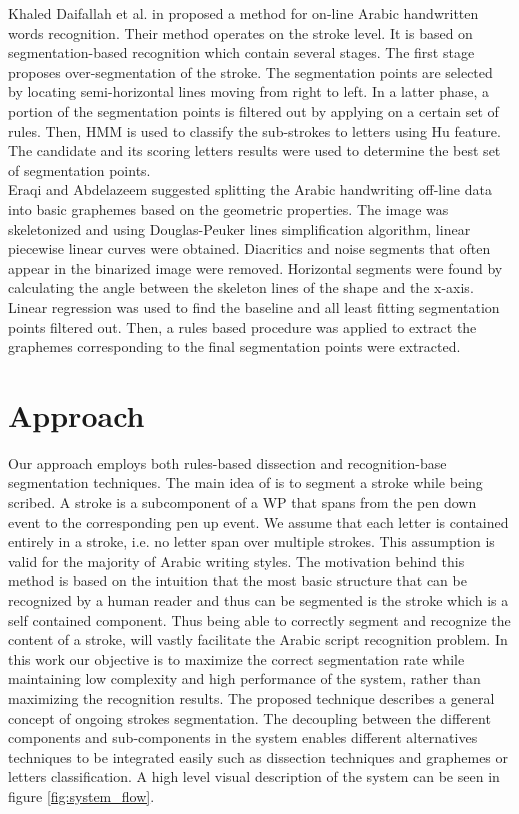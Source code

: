 \documentclass[journal,compsoc]{IEEEtran}
\begin{document}
Khaled Daifallah et al. in \cite{daifallah2009recognition} proposed a method for on-line Arabic handwritten words recognition. Their method operates on the stroke level. It is based on segmentation-based recognition which contain several stages. The first stage proposes over-segmentation of the stroke. The segmentation points are selected by locating semi-horizontal lines moving from right to left. In a latter phase, a portion of the segmentation points is filtered out by applying on a certain set of rules. Then, HMM is used to classify the sub-strokes to letters using Hu feature. The candidate and its scoring letters results were used to determine the best set of segmentation points. \\

Eraqi and Abdelazeem \cite{eraqi2012new} suggested splitting the Arabic handwriting off-line data into basic graphemes based on the geometric properties. The image was skeletonized and using Douglas-Peuker lines simplification algorithm, linear piecewise linear curves were obtained. Diacritics and noise segments that often appear in the binarized image were removed. Horizontal segments were found by calculating the angle between the skeleton lines of the shape and the x-axis. Linear regression was used to find the baseline and all least fitting segmentation points filtered out. Then, a rules based procedure was applied to extract the graphemes corresponding to the final segmentation points were extracted.    

\section{Approach}
\label{sec:approach}
Our approach employs both rules-based dissection and recognition-base segmentation techniques. The main idea of is to  segment a stroke while being scribed. A stroke is a subcomponent of a WP that spans from the pen down event to the corresponding pen up event. We assume that each letter is contained entirely in a stroke, i.e. no letter span over multiple strokes. This assumption is valid for the majority of Arabic writing styles. The motivation behind this method is based on the intuition that the most basic structure that can be recognized by a human reader and thus can be segmented is the stroke which is a self contained component. Thus being able to correctly segment and recognize the content of a stroke, will vastly facilitate the Arabic script recognition problem. In this work our objective is to maximize the correct segmentation rate while maintaining low complexity and high performance of the system, rather than maximizing the recognition results. 
The proposed technique describes a general concept of ongoing strokes segmentation. The decoupling between the different components and sub-components in the system enables different alternatives techniques to be integrated easily such as dissection techniques and graphemes or letters classification. A high level visual description of the system can be seen in figure \ref{fig:system_flow}.\\
\end{document}
